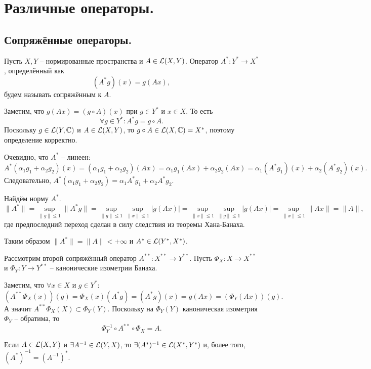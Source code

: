 \chapter{Различные операторы.}
\section{Сопряжённые операторы.}\label{seq:conjugate-operators}
\begin{definition}
    Пусть $X, Y$ -- нормированные пространства и $A \in \mathcal{L}(X, Y)$.
    Оператор $A^*\colon Y^* \to X^*$, определённый как
    \[
        (A^*g)(x) = g(Ax),
    \]
    будем называть сопряжённым к $A$.
\end{definition}
\begin{note}
    Заметим, что $g(Ax) = (g \circ A)(x)$ при $g \in Y^*$ и $x \in X$.
    То есть
    \[
        \forall g \in Y^*\colon A^*g = g \circ A.
    \]
    Поскольку $g \in \mathcal{L}(Y, \mathbb{C})$ и $A \in \mathcal{L}(X, Y)$, то $g \circ A \in \mathcal{L}(X, \mathbb{C}) = X^*$, поэтому определение корректно.

    Очевидно, что $A^*$ -- линеен:
    \[
        A^*(\alpha_1 g_1 + \alpha_2 g_2)(x) = (\alpha_1 g_1 + \alpha_2 g_2)(Ax) = \alpha_1 g_1(Ax) + \alpha_2 g_2 (Ax) = \alpha_1 (A^*g_1)(x) + \alpha_2 (A^*g_2)(x).
    \]
    Следовательно, $A^*(\alpha_1 g_1 + \alpha_2 g_2) = \alpha_1 A^* g_1 + \alpha_2 A^* g_2$.

    Найдём норму $A^*$.
    \[
        \|A^*\| = \sup_{\|g\| \leq 1} \|A^*g\| = \sup_{\|g\| \leq 1} \sup_{\|x\| \leq 1} |g(Ax)| = \sup_{\|x\| \leq 1}\sup_{\|g\| \leq 1} |g(Ax)| = \sup_{\|x\| \leq 1} \|Ax\| = \|A\|,
    \]
    где предпоследний переход сделан в силу следствия из теоремы Хана-Банаха.

    Таким образом $\|A^*\| = \|A\| < +\infty$ и $A^* \in \mathcal{L}(Y^*, X^*)$.
\end{note}
\begin{note}
    Рассмотрим второй сопряжённый оператор $A^{**}\colon X^{**} \to Y^{**}$.
    Пусть $\Phi_X\colon X \to X^{**}$ и $\Phi_Y\colon Y \to Y^{**}$ -- канонические изометрии Банаха.

    Заметим, что $\forall x \in X$ и $g \in Y^*\colon$
    \[
        (A^{**}\Phi_X(x))(g) = \Phi_X(x)(A^* g) = (A^* g)(x) = g(Ax) = (\Phi_Y(Ax))(g).
    \]
    А значит $A^{**}\Phi_X(X) \subset \Phi_Y(Y)$.
    Поскольку на $\Phi_Y(Y)$ каноническая изометрия $\Phi_Y$ -- обратима, то
    \[
        \Phi_Y^{-1} \circ A^{**} \circ \Phi_X = A.
    \]
\end{note}
\begin{proposition}
    Если $A \in \mathcal{L}(X, Y)$ и $\exists A^{-1}\in \mathcal{L}(Y, X)$, то $\exists (A^*)^{-1} \in \mathcal{L}(X^*, Y^*)$ и, более того, $(A^*)^{-1} = (A^{-1})^*$.
\end{proposition}
